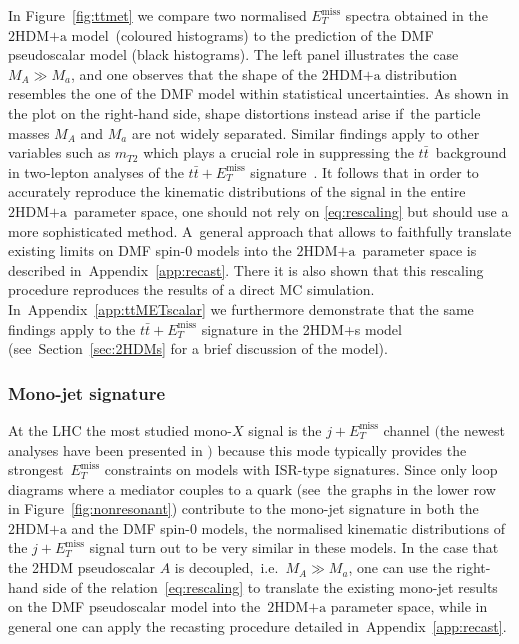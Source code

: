 \documentclass[a4paper, 11pt,notoc]{article}
\newcommand{\MET}{\ensuremath{E_T^\mathrm{miss}}\xspace}
\newcommand{\mA}{\ensuremath{M_{A}}\xspace}
\newcommand{\ma}{\ensuremath{M_{a}}\xspace}
\newcommand{\hdma}{\ensuremath{\textrm{2HDM+a}}\xspace}
\begin{document}
In Figure~\ref{fig:ttmet} we compare two normalised $\MET$ spectra obtained in the \hdma model~(coloured histograms) to the prediction of the DMF pseudoscalar   model (black histograms).  The left panel illustrates the case~$M_A \gg M_a$, and one observes that the shape of the \hdma distribution resembles  the one of the DMF model within statistical uncertainties. As shown in the plot on the right-hand side, shape distortions instead arise if~the particle masses $M_A$ and $M_a$ are not widely separated.  Similar findings apply to other variables such as $m_{T2}$ which  plays a crucial role in suppressing the $t \bar t$~background in two-lepton analyses of the $t \bar t + \MET$ signature~\cite{Aaboud:2017rzf,Haisch:2016gry,CMS-PAS-EXO-17-014}. It follows that in order to accurately reproduce the kinematic distributions of the signal in the entire \hdma~parameter space, one should not rely on \eqref{eq:rescaling} but should use a more sophisticated method. A~general approach  that allows to faithfully translate existing limits on DMF spin-0   models into the \hdma~parameter space  is described in~Appendix~\ref{app:recast}. There it is also shown that this rescaling procedure reproduces the results of a direct MC simulation.  In~Appendix~\ref{app:ttMETscalar} we furthermore demonstrate that the same findings apply to the $t \bar t + \MET$ signature in the 2HDM+s model  (see~Section~\ref{sec:2HDMs} for a brief discussion of the model).

\subsubsection{Mono-jet signature}

At the LHC the most studied mono-$X$ signal is the $j +\MET$ channel $\big($the newest analyses have been presented in \cite{Aaboud:2017phn,Sirunyan:2017jix}$\big)$ because this mode typically provides the strongest~$\MET$ constraints on models with ISR-type  signatures. Since only loop diagrams where a mediator couples to a quark (see~the graphs in the lower row in Figure~\ref{fig:nonresonant}) contribute to the mono-jet signature in both the \hdma and the DMF spin-0 models, the normalised kinematic distributions of the $j +\MET$ signal turn out to be very similar in these models.  In the case that the 2HDM pseudoscalar $A$ is decoupled,~i.e.~$\mA \gg \ma$, one can use the right-hand side of the relation~\eqref{eq:rescaling} to translate the existing mono-jet results on the DMF pseudoscalar model into the~\hdma parameter space, while in general one can apply the recasting procedure detailed in~Appendix~\ref{app:recast}.
\end{document}
